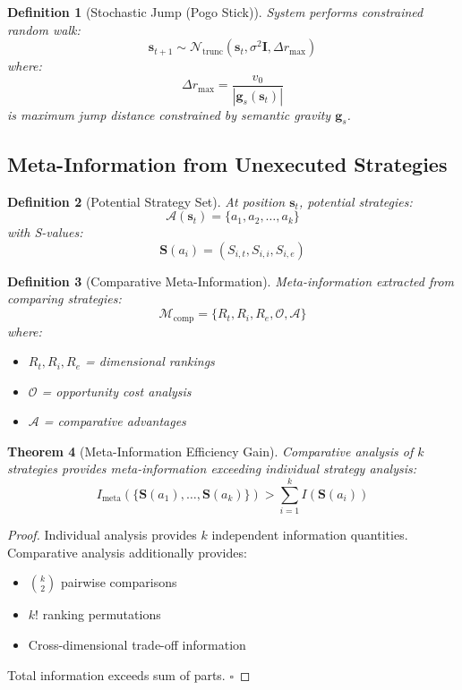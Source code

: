 \documentclass[12pt]{article}
\newtheorem{theorem}{Theorem}
\newtheorem{definition}[theorem]{Definition}
\begin{document}
\begin{definition}[Stochastic Jump (Pogo Stick)]
System performs constrained random walk:
$$
\mathbf{s}_{t+1} \sim \mathcal{N}_{\text{trunc}}(\mathbf{s}_t, \sigma^2 \mathbf{I}, \Delta r_{\max})
$$
where:
$$
\Delta r_{\max} = \frac{v_0}{|\mathbf{g}_s(\mathbf{s}_t)|}
$$
is maximum jump distance constrained by semantic gravity $\mathbf{g}_s$.
\end{definition}

\subsection{Meta-Information from Unexecuted Strategies}

\begin{definition}[Potential Strategy Set]
At position $\mathbf{s}_t$, potential strategies:
$$
\mathcal{A}(\mathbf{s}_t) = \{a_1, a_2, \ldots, a_k\}
$$
with S-values:
$$
\mathbf{S}(a_i) = (S_{i,t}, S_{i,i}, S_{i,e})
$$
\end{definition}

\begin{definition}[Comparative Meta-Information]
Meta-information extracted from comparing strategies:
$$
\mathcal{M}_{\text{comp}} = \{R_t, R_i, R_e, \mathcal{O}, \mathcal{A}\}
$$
where:
\begin{itemize}
    \item $R_t, R_i, R_e$ = dimensional rankings
    \item $\mathcal{O}$ = opportunity cost analysis
    \item $\mathcal{A}$ = comparative advantages
\end{itemize}
\end{definition}

\begin{theorem}[Meta-Information Efficiency Gain]
Comparative analysis of $k$ strategies provides meta-information exceeding individual strategy analysis:
$$
I_{\text{meta}}(\{\mathbf{S}(a_1), \ldots, \mathbf{S}(a_k)\}) > \sum_{i=1}^{k} I(\mathbf{S}(a_i))
$$
\end{theorem}

\begin{proof}
Individual analysis provides $k$ independent information quantities. Comparative analysis additionally provides:
\begin{itemize}
    \item $\binom{k}{2}$ pairwise comparisons
    \item $k!$ ranking permutations
    \item Cross-dimensional trade-off information
\end{itemize}
Total information exceeds sum of parts.
$\square$
\end{proof}
\end{document}
